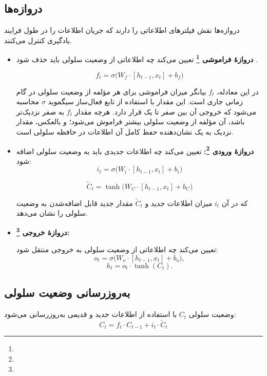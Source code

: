 \subsection{دروازه‌ها}
دروازه‌ها نقش فیلترهای اطلاعاتی را دارند که جریان اطلاعات را در طول فرایند یادگیری کنترل می‌کنند.

\begin{itemize}
	\item \textbf{دروازهٔ فراموشی \footnote{}}
	تعیین می‌کند چه اطلاعاتی از وضعیت سلولی باید حذف شود
	\cite{gers1999learning}.
	
	\begin{equation}
		f_t = \sigma \big( W_f \cdot [h_{t-1}, x_t] + b_f \big)
	\end{equation}

در این معادله، \( f_t \) بیانگر میزان فراموشی برای هر مؤلفه از وضعیت سلولی در گام زمانی جاری است. این مقدار با استفاده از تابع فعال‌ساز سیگموید \( \sigma \) محاسبه می‌شود که خروجی آن بین صفر تا یک قرار دارد. هرچه مقدار \( f_t \) به صفر نزدیک‌تر باشد، آن مؤلفه از وضعیت سلولی بیشتر فراموش می‌شود؛ و بالعکس، مقدار نزدیک به یک نشان‌دهنده حفظ کامل آن اطلاعات در حافظه سلولی است.



	\item \textbf{دروازهٔ ورودی \footnote{}:}
	تعیین می‌کند چه اطلاعات جدیدی باید به وضعیت سلولی اضافه شود:
	\begin{equation}
		i_t = \sigma \big( W_i \cdot [h_{t-1}, x_t] + b_i \big)
	\end{equation}
	
	\begin{equation}
		\tilde{C}_t = \tanh \big( W_C \cdot [h_{t-1}, x_t] + b_C \big)
	\end{equation}

	که در آن \( i_t \) میزان اطلاعات جدید و \( \tilde{C}_t \) مقدار جدید قابل اضافه‌شدن به وضعیت سلولی را نشان می‌دهد.
	
\item \textbf{دروازهٔ خروجی \footnote{}:}

	تعیین می‌کند چه اطلاعاتی از وضعیت سلولی به خروجی منتقل شود:
	\[
	o_t = \sigma \big( W_o \cdot [h_{t-1}, x_t] + b_o \big),
	\]
	\[
	h_t = o_t \cdot \tanh(C_t).
	\]
\end{itemize}

\subsection{به‌روزرسانی وضعیت سلولی}
وضعیت سلولی \( C_t \) با استفاده از اطلاعات جدید و قدیمی به‌روزرسانی می‌شود:
	\begin{equation}
		C_t = f_t \cdot C_{t-1} + i_t \cdot \tilde{C}_t
	\end{equation}

